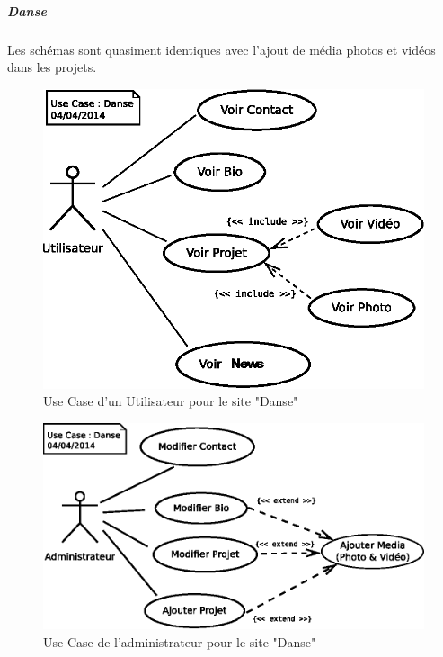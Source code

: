 \documentclass[11pt,a4paper]{report}
\begin{document}
					\subparagraph*{Danse}Les schémas sont quasiment identiques avec l'ajout de média photos et vidéos dans les projets.
						\begin{figure}[H]
							\centering
							\includegraphics[width=12cm]{UseCase-Danse-User.eps}
							\caption[Use Case Utilisateur Danse]{Use Case d'un Utilisateur pour le site "Danse"}
							\label{fig:UseCase-Danse User}
						\end{figure}
						\begin{figure}[H]
							\centering
							\includegraphics[width=16cm]{UseCase-Danse-Administrateur.eps}
							\caption[Use Case Administrateur Danse]{Use Case de l'administrateur pour le site "Danse"}
							\label{fig:UseCase-Danse Admin}
						\end{figure}
\end{document}
